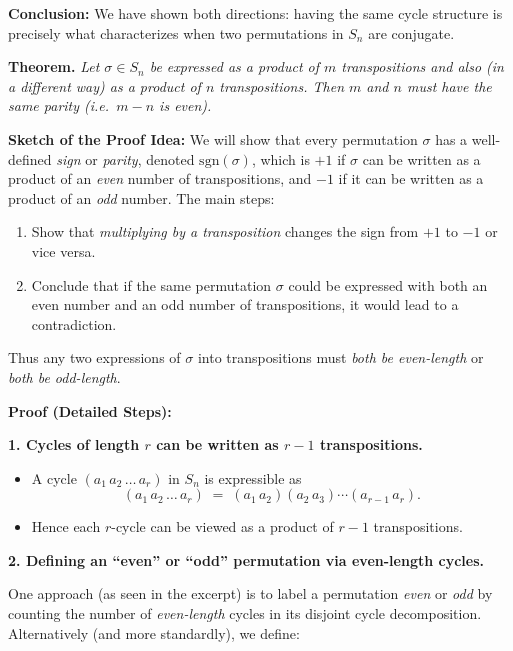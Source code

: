 \documentclass[12pt]{article}
\theoremstyle{definition} %
\theoremstyle{plain} %
\begin{document}
\noindent
\textbf{Conclusion:} We have shown both directions: having the same cycle structure is precisely what characterizes when two permutations in $S_n$ are conjugate.

\noindent
\textbf{Theorem.}
\emph{Let $\sigma \in S_n$ be expressed as a product of $m$ transpositions and also (in a different way) as a product of $n$ transpositions. Then $m$ and $n$ must have the same parity (i.e.\ $m - n$ is even).}

\bigskip

\noindent
\textbf{Sketch of the Proof Idea:}
We will show that every permutation $\sigma$ has a well-defined \emph{sign} or \emph{parity}, denoted $\mathrm{sgn}(\sigma)$, which is $+1$ if $\sigma$ can be written as a product of an \emph{even} number of transpositions, and $-1$ if it can be written as a product of an \emph{odd} number.  The main steps:

\begin{enumerate}
    \item Show that \emph{multiplying by a transposition} changes the sign from $+1$ to $-1$ or vice versa.
    \item Conclude that if the same permutation $\sigma$ could be expressed with both an even number and an odd number of transpositions, it would lead to a contradiction.
\end{enumerate}

\noindent
Thus any two expressions of $\sigma$ into transpositions must \emph{both be even-length} or \emph{both be odd-length}.

\bigskip

\noindent
\textbf{Proof (Detailed Steps):}

\medskip

\noindent
\textbf{1. Cycles of length $r$ can be written as $r-1$ transpositions.}

\begin{itemize}
    \item A cycle $(a_1\, a_2\,\dots\,a_r)$ in $S_n$ is expressible as
    \[
       (a_1\, a_2\,\dots\,a_r) \;=\; (a_1\, a_2)(a_2\, a_3)\cdots (a_{r-1}\, a_r).
    \]
    \item Hence each $r$-cycle can be viewed as a product of $r-1$ transpositions.
\end{itemize}

\medskip

\noindent
\textbf{2. Defining an “even” or “odd” permutation via even-length cycles.} 

One approach (as seen in the excerpt) is to label a permutation \emph{even} or \emph{odd} by counting the number of \emph{even-length} cycles in its disjoint cycle decomposition.  Alternatively (and more standardly), we define:
\end{document}
